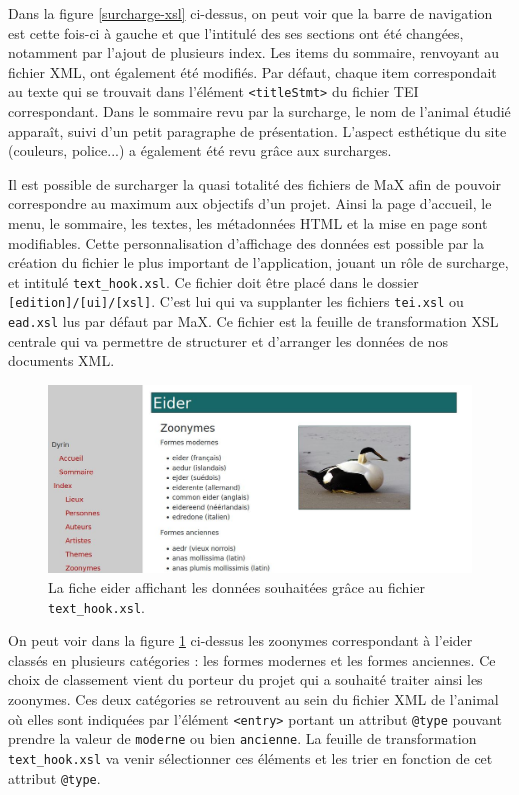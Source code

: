 \documentclass[a4paper,12pt,twoside]{book}
\begin{document}
Dans la figure \ref{surcharge-xsl} ci-dessus, on peut voir que la barre de navigation est cette fois-ci à gauche et que l'intitulé des ses sections ont été changées, notamment par l'ajout de plusieurs index. Les items du sommaire, renvoyant au fichier XML, ont également été modifiés. Par défaut, chaque item correspondait au texte qui se trouvait dans l'élément \texttt{<titleStmt>} du fichier TEI correspondant. Dans le sommaire revu par la surcharge, le nom de l'animal étudié apparaît, suivi d'un petit paragraphe de présentation. L'aspect esthétique du site (couleurs, police...) a également été revu grâce aux surcharges.


Il est possible de surcharger la quasi totalité des fichiers de MaX afin de pouvoir correspondre au maximum aux objectifs d'un projet. Ainsi la page d'accueil, le menu, le sommaire, les textes, les métadonnées \acrshort{HTML} et la mise en page sont modifiables. Cette personnalisation d'affichage des données est possible par la création du fichier le plus important de l'application, jouant un rôle de surcharge, et intitulé \texttt{text\_hook.xsl}. Ce fichier doit être placé dans le dossier \texttt{[edition]/[ui]/[xsl]}. C'est lui qui va supplanter les fichiers \texttt{tei.xsl} ou \texttt{ead.xsl} lus par défaut par MaX. Ce fichier est la feuille de transformation \acrshort{XSL} centrale qui va permettre de structurer et d'arranger les données de nos documents XML.

\begin{figure}[H]
    \centering
    \includegraphics[width=12cm]{img/partie_2/eider_surcharge.JPG}
    \caption{La fiche eider affichant les données souhaitées grâce au fichier \texttt{text\_hook.xsl}.}
    \label{eider}
\end{figure}

On peut voir dans la figure \ref{eider} ci-dessus les zoonymes correspondant à l'eider classés en plusieurs catégories : les formes modernes et les formes anciennes. Ce choix de classement vient du porteur du projet qui a souhaité traiter ainsi les zoonymes. Ces deux catégories se retrouvent au sein du fichier XML de l'animal où elles sont indiquées par l'élément \texttt{<entry>} portant un attribut \texttt{@type} pouvant prendre la valeur de \texttt{moderne} ou bien \texttt{ancienne}. La feuille de transformation \texttt{text\_hook.xsl} va venir sélectionner ces éléments et les trier en fonction de cet attribut \texttt{@type}.
\end{document}
